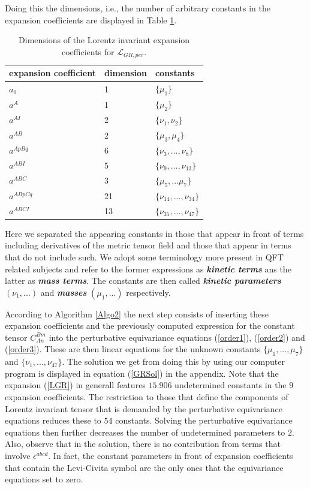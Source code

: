 \documentclass[a4paper,12pt, DIV=14, BCOR=5mm, twoside, headsepline, numbers=noenddot]{scrbook}
\begin{document}
Doing this the dimensions, i.e., the number of arbitrary constants in the expansion coefficients are displayed in Table \ref{GRExp}.
\begin{table}
\centering 
\begin{tabular}{lll}\toprule
    expansion coefficient & dimension & constants   \\ \midrule
    $a_0$ & 1 & $\{\mu_1\}$ \\
    $a^A$ & 1 & $\{\mu_2\}$ \\
    $a^{AI}$ & 2 & $\{\nu_1, \nu_2\}$ \\
    $a^{AB}$ & 2 & $\{\mu_3, \mu_4 \} $ \\
    $a^{ApBq}$ & 6 & $\{\nu_3,...,\nu_8\}$ \\
    $a^{ABI}$ & 5 & $\{ \nu_9,...,\nu_{13} \}$ \\
    $a^{ABC}$ & 3 & $\{ \mu_5,...\mu_7 \}$\\
    $a^{ABpCq}$ & 21 & $\{\nu_{14},...,\nu_{34} \}$ \\
    $a^{ABCI}$ & 13 & $\{ \nu_{35},...,\nu_{47}\}$\\ \bottomrule
\end{tabular}
\caption{Dimensions of the Lorentz invariant expansion coefficients for $\mathcal{L}_{GR,per}$.}\label{GRExp}
\end{table}
Here we separated the appearing constants in those that appear in front of terms including derivatives of the metric tensor field and those that appear in terms that do not include such. We adopt some terminology more present in QFT related subjects and refer to the former expressions as \textbf{\textit{kinetic terms}} ans the latter as \textit{\textbf{mass terms}}. The constants are then called \textit{\textbf{kinetic parameters}} $(\nu_1,...)$ and \textit{\textbf{masses}} $(\mu_1,...)$ respectively.   

According to Algorithm \ref{Algo2} the next step consists of inserting these expansion coefficients and the previously computed expression for the constant tensor $C_{An}^{Bm}$ into the perturbative equivariance equations (\ref{order1}), (\ref{order2}) and (\ref{order3}). These are then linear equations for the unknown constants $\{ \mu_1,...,\mu_7\}$ and $\{\nu_1,...,\nu_{47}\}$. The solution we get from doing this by using our computer program is displayed in equation (\ref{GRSol}) in the appendix. Note that the expansion (\ref{LGR}) in generall features $15.906$ undetermined constants in the $9$ expansion coefficients. The restriction to those that define the components of Lorentz invariant tensor that is demanded by the perturbative equivariance equations reduces these to $54$ constants. Solving the perturbative equivariance equations then further decreases the number of undetermined parameters to $2$. Also, observe that in the solution, there is no contribution from terms that involve $\epsilon^{abcd}$. In fact, the constant parameters in front of expansion coefficients that contain the Levi-Civita symbol are the only ones that the equivariance equations set to zero.  
\end{document}

